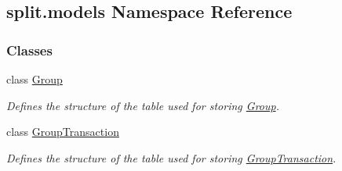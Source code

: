 \hypertarget{namespacesplit_1_1models}{}\subsection{split.\+models Namespace Reference}
\label{namespacesplit_1_1models}
\subsubsection*{Classes}
\begin{DoxyCompactItemize}
\item 
class \hyperlink{classsplit_1_1models_1_1Group}{Group}
\begin{DoxyCompactList}\small\item\em Defines the structure of the table used for storing \hyperlink{classsplit_1_1models_1_1Group}{Group}. \end{DoxyCompactList}\item 
class \hyperlink{classsplit_1_1models_1_1GroupTransaction}{Group\+Transaction}
\begin{DoxyCompactList}\small\item\em Defines the structure of the table used for storing \hyperlink{classsplit_1_1models_1_1GroupTransaction}{Group\+Transaction}. \end{DoxyCompactList}\end{DoxyCompactItemize}
